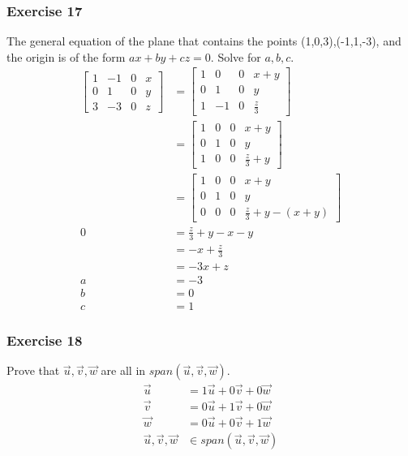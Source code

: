 \documentclass[letterpaper, 12pt]{math}
\begin{document}
\subsubsection*{Exercise 17}
The general equation of the plane that contains the points (1,0,3),(-1,1,-3),
and the origin is of the form \( ax+by+cz = 0 \). Solve for \( a, b, c \).
\begin{align*}
  \begin{bmatrix}
    1 & -1 & 0 & x \\
    0 & 1 & 0 & y \\
    3 & -3 & 0 & z
  \end{bmatrix} &= \begin{bmatrix}
    1 & 0 & 0 & x+y \\
    0 & 1 & 0 & y \\
    1 & -1 & 0 & \frac{z}{3}
  \end{bmatrix} \\
  &= \begin{bmatrix}
    1 & 0 & 0 & x+y \\
    0 & 1 & 0 & y \\
    1 & 0 & 0 & \frac{z}{3}+y
  \end{bmatrix} \\
  &= \begin{bmatrix}
    1 & 0 & 0 & x+y \\
    0 & 1 & 0 & y \\
    0 & 0 & 0 & \frac{z}{3}+y-(x+y)
  \end{bmatrix} \\
  0 &= \frac{z}{3}+y-x-y \\
  &= -x+\frac{z}{3} \\
  &= -3x+z \\
  a &= -3 \\
  b &= 0 \\
  c &= 1
\end{align*}

\subsubsection*{Exercise 18}
Prove that \( \vec{u},\vec{v},\vec{w} \) are all in
\( span(\vec{u},\vec{v},\vec{w}) \).
\begin{align*}
  \vec{u} &= 1\vec{u}+0\vec{v}+0\vec{w} \\
  \vec{v} &= 0\vec{u}+1\vec{v}+0\vec{w} \\
  \vec{w} &= 0\vec{u}+0\vec{v}+1\vec{w} \\
  \vec{u},\vec{v},\vec{w} &\in span(\vec{u},\vec{v},\vec{w})
\end{align*}
\end{document}
